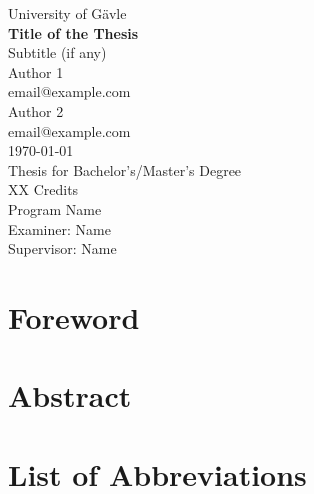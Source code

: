 \documentclass[a4paper, 12pt]{book} %
\begin{document}
\frontmatter %
\pagestyle{plain} %


\begin{titlepage} %
    \centering
    \vspace*{1cm}
    \Large University of Gävle\\[1cm]
    \Huge \textbf{Title of the Thesis}\\[0.5cm]
    \LARGE Subtitle (if any)\\[2cm]
    \Large
    Author 1\\
    email@example.com\\[1cm]
    Author 2\\
    email@example.com\\[2cm]
    \today\\[2cm]
    Thesis for Bachelor's/Master's Degree\\
    XX Credits\\
    Program Name\\[2cm]
    Examiner: Name\\
    Supervisor: Name
\end{titlepage}


\chapter*{Foreword} %
\label{sec:foreword} %

\chapter*{Abstract} %
\label{sec:abstract}



\chapter*{List of Abbreviations}
\label{sec:abbreviations}

\newpage %

\tableofcontents %

\end{document}
